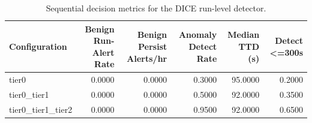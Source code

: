 \begin{table}[t]
\centering
\caption{Sequential decision metrics for the DICE run-level detector.}
\label{tab:dice_sequential_metrics}
\footnotesize
\begin{tabular}{lrrrrr}
\toprule
Configuration & Benign Run-Alert Rate & Benign Persist Alerts/hr & Anomaly Detect Rate & Median TTD (s) & Detect <=300s \\
\midrule
tier0 & 0.0000 & 0.0000 & 0.3000 & 95.0000 & 0.2000 \\
tier0_tier1 & 0.0000 & 0.0000 & 0.5000 & 92.0000 & 0.3500 \\
tier0_tier1_tier2 & 0.0000 & 0.0000 & 0.9500 & 92.0000 & 0.6500 \\
\bottomrule
\end{tabular}

\end{table}
